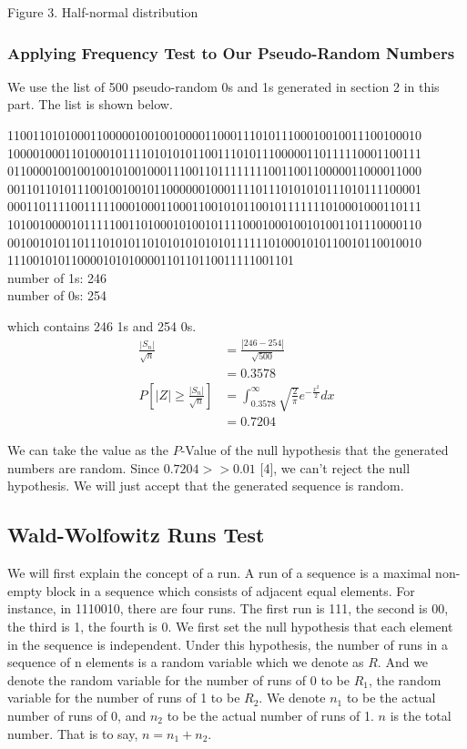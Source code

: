 \documentclass[a4paper,12pt]{article}
\begin{document}
\centerline{Figure 3. Half-normal distribution}
\subsubsection{Applying Frequency Test to Our Pseudo-Random Numbers}
\noindent We use the list of 500 pseudo-random 0s and 1s generated in section 2 in this part. The list is shown below.
\begin{tcolorbox}[title = {random.txt}] %
11001101010001100000100100100001100011101011100010010011100100010\\10000100011010001011110101010110011101011100000110111110001100111\\01100001001001001010010001110011011111111001100110000011000011000\\00110110101110010010010110000001000111101110101010111010111100001\\00011011110011111000100011000110010101100101111111010001000110111\\10100100001011111001101000101001011110001000100101001101110000110\\00100101011011101010110101010101010111111010001010110010110010010\\111001010110000101010000110110110011111001101\\
number of 1s: 246\\
number of 0s: 254
\end{tcolorbox}
\noindent which contains 246 1s and 254 0s.
\begin{equation*}
\begin{split}
\frac{|S_n|}{\sqrt{n}}&=\frac{|246-254|}{\sqrt{500}}\\
					  &=0.3578\\
P[|Z|\geq \frac{|S_n|}{\sqrt{n}}]&=\int_{0.3578}^{\infty}\sqrt{\frac{2}{\pi}}e^{-\frac{x^2}{2}}dx\\
                                 &=0.7204
\end{split}
\end{equation*}

\noindent  We can take the value as the $P$-Value of the null hypothesis that the generated numbers are random.  Since $0.7204>>0.01$ [4], we can't reject the null hypothesis. We will just accept that the generated sequence is random.\\

\subsection{Wald-Wolfowitz Runs Test}
\noindent We will first explain the concept of a run. A run of a sequence is a maximal non-empty block in a sequence which consists of adjacent equal elements. For instance, in 1110010, there are four runs. The first run is 111, the second is 00, the third is 1, the fourth is 0. We first set the null hypothesis that each element in the sequence is independent. Under this hypothesis, the number of runs in a sequence of n elements is a random variable which we denote as $R$. And we denote the random variable for the number of runs of 0 to be $R_1$, the random variable for the number of runs of 1 to be $R_2$. We denote $n_1$ to be the actual number of runs of 0, and $n_2$ to be the actual number of runs of 1. $n$ is the total number. That is to say, $n = n_1+n_2$.
\end{document}
